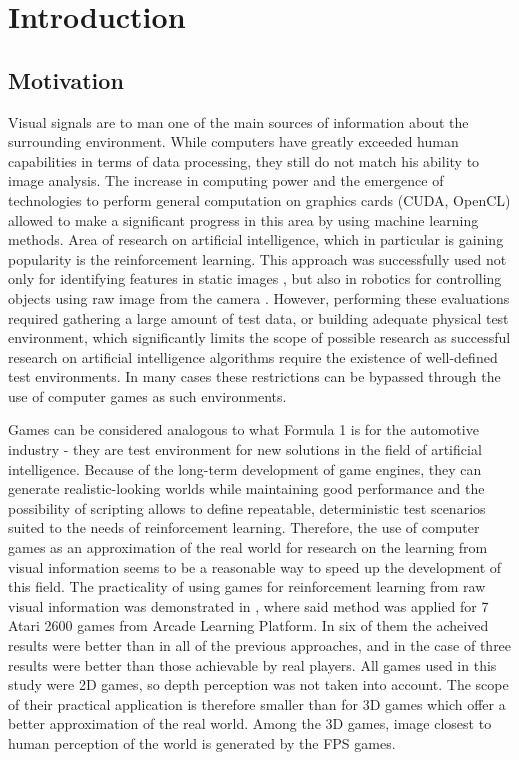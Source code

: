 
\chapter{Introduction}
\label{ch:introduction}
\section{Motivation}


Visual signals are to man one of the main sources of information about the surrounding environment.
While computers have greatly exceeded human capabilities in terms of data processing, they still do not match his ability to image analysis.
The increase in computing power and the emergence of technologies to perform general computation on graphics cards (CUDA, OpenCL) allowed to make a significant progress in this area by using machine learning methods.
Area of research on artificial intelligence, which in particular is gaining popularity is the reinforcement learning.
This approach was successfully used not only for identifying features in static images \cite{conf/cvpr/GoodrichA12}, but also in robotics for controlling objects using raw image from the camera \cite{rieijcnn12}.
However, performing these evaluations required gathering a large amount of test data, or building adequate physical test environment, which significantly limits the scope of possible research as
successful research on artificial intelligence algorithms require the existence of well-defined test environments.
In many cases these restrictions can be bypassed through the use of computer games as such environments.


Games can be considered analogous to what Formula 1 is for the automotive industry - they are test environment for new solutions in the field of artificial intelligence.
Because of the long-term development of game engines, they can generate realistic-looking worlds while maintaining good performance and
the possibility of scripting allows to define repeatable, deterministic test scenarios suited to the needs of reinforcement learning.
Therefore, the use of computer games as an approximation of the real world for research on the learning from visual information seems to be a reasonable way to speed up the development of this field. 
The practicality of using games for reinforcement learning from raw visual information was demonstrated in \cite{mnih-atari-2013}, where said method was applied for 7 Atari 2600 games from Arcade Learning Platform.
 In six of them the acheived results were better than in all of the previous approaches, and in the case of three results were better than those achievable by real players.
All games used in this study were 2D games, so depth perception was not taken into account.
The scope of their practical application is therefore smaller than for 3D games which offer a better approximation of the real world.
Among the 3D games, image closest to human perception of the world is generated by the FPS games.


